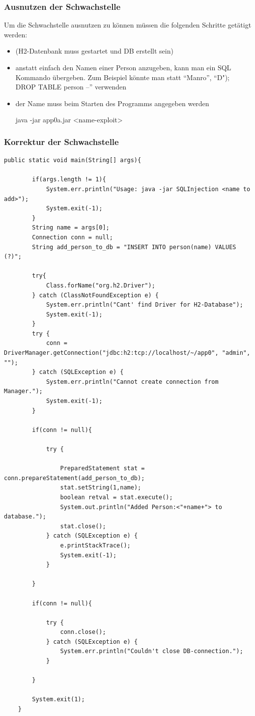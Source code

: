 \documentclass[12pt,a4paper,titlepage,oneside]{scrartcl}
\begin{document}
\subsubsection{Ausnutzen der Schwachstelle}

Um die Schwachstelle ausnutzen zu können müssen die folgenden Schritte getätigt werden:
\begin{itemize}
\item (H2-Datenbank muss gestartet und DB erstellt sein)
\item anstatt einfach den Namen einer Person anzugeben, kann man ein SQL Kommando übergeben. Zum Beispiel könnte man statt "`Manro"', "`D"); DROP TABLE person --"' verwenden
\item der Name muss beim Starten des Programms angegeben werden
	\begin{center}
	java -jar app0a.jar <name-exploit>
	\end{center}
\end{itemize}

\subsubsection{Korrektur der Schwachstelle}

\begin{lstlisting}[caption=korregierter Code,label=code:app0b,style=c]
public static void main(String[] args){

        if(args.length != 1){
            System.err.println("Usage: java -jar SQLInjection <name to add>");
            System.exit(-1);
        }
        String name = args[0];
        Connection conn = null;
        String add_person_to_db = "INSERT INTO person(name) VALUES (?)";

        try{
            Class.forName("org.h2.Driver");
        } catch (ClassNotFoundException e) {
            System.err.println("Cant' find Driver for H2-Database");
            System.exit(-1);
        }
        try {
            conn = DriverManager.getConnection("jdbc:h2:tcp://localhost/~/app0", "admin", "");
        } catch (SQLException e) {
            System.err.println("Cannot create connection from Manager.");
            System.exit(-1);
        }

        if(conn != null){

            try {

                PreparedStatement stat = conn.prepareStatement(add_person_to_db);
                stat.setString(1,name);
                boolean retval = stat.execute();
                System.out.println("Added Person:<"+name+"> to database.");
                stat.close();
            } catch (SQLException e) {
                e.printStackTrace();
                System.exit(-1);
            }

        }

        if(conn != null){

            try {
                conn.close();
            } catch (SQLException e) {
                System.err.println("Couldn't close DB-connection.");
            }

        }

        System.exit(1);
    }
\end{lstlisting}
\end{document}
